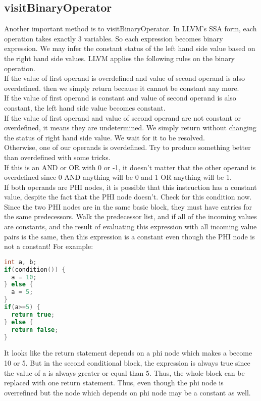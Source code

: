 \subsection{visitBinaryOperator}
Another important method is to visitBinaryOperator. In LLVM’s SSA form, each operation takes exactly 3 variables. So each expression becomes binary expression. We may infer the constant status of the left hand side value based on the right hand side values. LLVM applies the following rules on the binary operation. \\
If the value of first operand is overdefined and value of second operand is also overdefined. then we simply return because it cannot be constant any more. \\
If the value of first operand is constant and value of second operand is also constant, the left hand side value becomes constant. \\
If the value of first operand and value of second operand are not constant or overdefined, it means they are undetermined. We simply return without changing the status of right hand side value. We wait for it to be resolved. \\
Otherwise, one of our operands is overdefined. Try to produce something better than overdefined with some tricks. \\
If this is an AND or OR with 0 or -1, it doesn't matter that the other operand is overdefined since 0 AND anything will be 0 and 1 OR anything will be 1. \\
If both operands are PHI nodes, it is possible that this instruction has a constant value, despite the fact that the PHI node doesn't. Check for this condition now. \\
Since the two PHI nodes are in the same basic block, they must have entries for the same predecessors.  Walk the predecessor list, and if all of the incoming values are constants, and the result of evaluating this expression with all incoming value pairs is the same, then this expression is a constant even though the PHI node is not a constant! For example:
\begin{lstlisting}[language=c]
int a, b;
if(condition()) {
  a = 10;
} else {
  a = 5;
}
if(a>=5) {
  return true;
} else {
  return false;
}
\end{lstlisting}
It looks like the return statement depends on a phi node which makes a become 10 or 5. But in the second conditional block, the expression is always true since the value of a is always greater or equal than 5. Thus, the whole block can be replaced with one return statement. Thus, even though the phi node is overrefined but the node which depends on phi node may be a constant as well. \\
